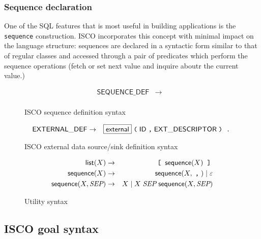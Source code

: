 \subsubsection{Sequence declaration}
\label{sec:sequence-declaration}

One of the SQL features that is most useful in building applications is the
\texttt{sequence} construction.  ISCO incorporates this concept with minimal
impact on the language structure: sequences are declared in a syntactic form
similar to that of regular classes and accessed through a pair of predicates
which perform the sequence operations (fetch or set next value and inquire
aboutr the current value.)

\begin{figure}[htb]
  \centering
  \begin{eqnarray*}
    \mathsf{SEQUENCE\_DEF} & \rightarrow &  \\
  \end{eqnarray*}
  \caption{ISCO sequence definition syntax}
  \label{fig:syntax:sequence}
\end{figure}

\begin{figure}[htb]
  \centering
  \begin{eqnarray*}
    \mathsf{EXTERNAL\_DEF} & \rightarrow &
    \fbox{\textsf{external}}\;\texttt{(}\;\mathsf{ID}\;\texttt{,}\;
    \mathsf{EXT\_DESCRIPTOR}\;\texttt{)}\; \;\texttt{.}\;
  \end{eqnarray*}
  \caption{ISCO external data source/sink definition syntax}
  \label{fig:syntax:external}
\end{figure}

\begin{figure}[htb]
  \centering
  \begin{eqnarray*}
    \mathsf{list}(X) & \rightarrow & \;\texttt{[}\; \; \mathsf{sequence}(X) \;
    \;\texttt{]}\; \\
    \mathsf{sequence}(X) & \rightarrow & \mathsf{sequence}(X, \;\texttt{,}\;) \;|\;
    \varepsilon \\
    \mathsf{sequence}(X, \emph{SEP}) & \rightarrow & X \;|\;
    X \; \emph{SEP} \; \mathsf{sequence}(X, \emph{SEP})
  \end{eqnarray*}
  \caption{Utility syntax}
  \label{fig:syntax:utility}
\end{figure}

\subsection{ISCO goal syntax}
\label{sec:isco-goal-syntax}


